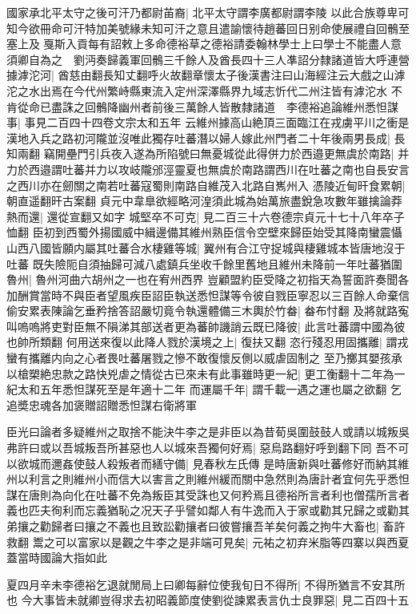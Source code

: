 國家承北平太守之後可汗乃都尉苖裔|{
	北平太守謂李廣都尉謂李陵}
以此合族尊卑可知今欲冊命可汗特加美號緣未知可汗之意且遣諭懷待趙蕃回日别命使展禮自回鶻至塞上及戛斯入貢每有詔敕上多命德裕草之德裕請委翰林學士上曰學士不能盡人意須卿自為之　劉沔奏歸義軍回鶻三千餘人及酋長四十三人凖詔分隸諸道皆大呼連營據滹沱河|{
	酋慈由翻長知丈翻呼火故翻章懷太子後漢書注曰山海經注云大戲之山滹沱之水出焉在今代州繁峙縣東流入定州深澤縣界九域志忻代二州注皆有滹沱水}
不肯從命已盡誅之回鶻降幽州者前後三萬餘人皆散隸諸道　李德裕追論維州悉怛謀事|{
	事見二百四十四卷文宗太和五年}
云維州據高山絶頂三面臨江在戎虜平川之衝是漢地入兵之路初河隴並沒唯此獨存吐蕃潛以婦人嫁此州門者二十年後兩男長成|{
	長知兩翻}
竊開壘門引兵夜入遂為所陷號曰無憂城從此得併力於西邉更無虞於南路|{
	并力於西邉謂吐蕃并力以攻岐隴邠涇靈夏也無虞於南路謂西川在吐蕃之南也自長安言之西川亦在劒關之南若吐蕃寇蜀則南路自維茂入北路自嶲州入}
憑陵近甸旰食累朝|{
	朝直遥翻旰古案翻}
貞元中韋臯欲經略河湟須此城為始萬旅盡銳急攻數年雖擒論莽熱而還|{
	還從宣翻又如字}
城堅卒不可克|{
	見二百三十六卷德宗貞元十七十八年卒子恤翻}
臣初到西蜀外揚國威中緝邊備其維州熟臣信令空壁來歸臣始受其降南蠻震懾山西八國皆願内屬其吐蕃合水棲雞等城|{
	翼州有合江守捉城與棲雞城本皆唐地沒于吐蕃}
既失險阨自須抽歸可減八處鎮兵坐收千餘里舊地且維州未降前一年吐蕃猶圍魯州|{
	魯州河曲六胡州之一也在宥州西界}
豈顧盟約臣受降之初指天為誓面許奏聞各加酬賞當時不與臣者望風疾臣詔臣執送悉怛謀等令彼自戮臣寧忍以三百餘人命棄信偷安累表陳論乞垂矜捨答詔嚴切竟令執還體備三木輿於竹畚|{
	畚布忖翻}
及將就路寃叫嗚嗚將吏對臣無不隕涕其部送者更為蕃帥譏誚云既已降彼|{
	此言吐蕃謂中國為彼也帥所類翻}
何用送來復以此降人戮於漢境之上|{
	復扶又翻}
恣行殘忍用固攜離|{
	謂戎蠻有攜離内向之心者畏吐蕃屠戮之慘不敢復懷反側以威虐固制之}
至乃擲其嬰孩承以槍槊絶忠款之路快兇虐之情從古已來未有此事雖時更一紀|{
	更工衡翻十二年為一紀太和五年悉怛謀死至是年適十二年}
而運屬千年|{
	謂千載一遇之運也屬之欲翻}
乞追奬忠魂各加褒贈詔贈悉怛謀右衛將軍

臣光曰論者多疑維州之取捨不能決牛李之是非臣以為昔荀吳圍鼓鼓人或請以城叛吳弗許曰或以吾城叛吾所甚惡也人以城來吾獨何好焉|{
	惡烏路翻好呼到翻下同}
吾不可以欲城而邇姦使鼓人殺叛者而繕守備|{
	見春秋左氏傳}
是時唐新與吐蕃修好而納其維州以利言之則維州小而信大以害言之則維州緩而關中急然則為唐計者宜何先乎悉怛謀在唐則為向化在吐蕃不免為叛臣其受誅也又何矜焉且德裕所言者利也僧孺所言者義也匹夫徇利而忘義猶恥之况天子乎譬如鄰人有牛逸而入于家或勸其兄歸之或勸其弟攘之勸歸者曰攘之不義也且致訟勸攘者曰彼嘗攘吾羊矣何義之拘牛大畜也|{
	畜許救翻}
鬻之可以富家以是觀之牛李之是非端可見矣|{
	元祐之初弃米脂等四寨以與西夏蓋當時國論大指如此}


夏四月辛未李德裕乞退就閒局上曰卿每辭位使我旬日不得所|{
	不得所猶言不安其所也}
今大事皆未就卿豈得求去初昭義節度使劉從諫累表言仇士良罪惡|{
	見二百四十五}



